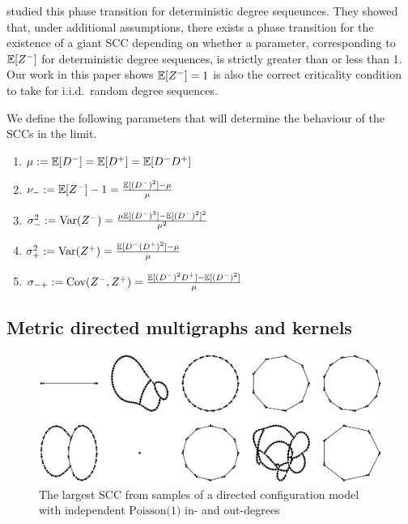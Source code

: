 \citet{cooperSizeLargestStrongly2004} studied this phase transition for deterministic degree sequeunces. They showed that, under additional assumptions, there exists a phase transition for the existence of a giant SCC depending on whether a parameter, corresponding to ${\mathbb E}[Z^-]$ for deterministic degree sequences, is strictly greater than or less than 1. Our work in this paper shows ${\mathbb E}[Z^-] = 1$ is also the correct criticality condition to take for i.i.d.\ random degree sequences.

We define the following parameters that will determine the behaviour of the SCCs in the limit.
\begin{enumerate}
    \item $\mu:={\mathbb E}[D^-]={\mathbb E}[D^+]={\mathbb E}[D^-D^+]$
    \item $\nu_-:= {\mathbb E}[Z^-] - 1 = \frac{{\mathbb E}[(D^-)^2]-\mu}{\mu}$ 
    \item $\sigma_-^2 := \operatorname{Var}(Z^-) = \frac{\mu{\mathbb E}[(D^-)^3]-{\mathbb E}[(D^-)^2]^2}{\mu^2}$ 
    \item $\sigma_+^2 := \operatorname{Var}(Z^+) = \frac{{\mathbb E}[D^-(D^+)^2]-\mu}{\mu}$ 
    \item $\sigma_{-+} := \operatorname{Cov}(Z^-, Z^+) = \frac{{\mathbb E}[(D^-)^2D^+]-{\mathbb E}[(D^-)^2]}{\mu}$ 
\end{enumerate}
\subsection{Metric directed multigraphs and kernels}\label{subsec.mdmkernels}

\begin{figure}[htbp]
    \centering

    \includegraphics[width=\textwidth]{Content/Pictures/largest_sccs.eps}
    
    \caption{The largest SCC from samples of a directed configuration model with independent $\text{Poisson(1)}$ in- and out-degrees}
    \label{fig:largest-sccs}
\end{figure}

